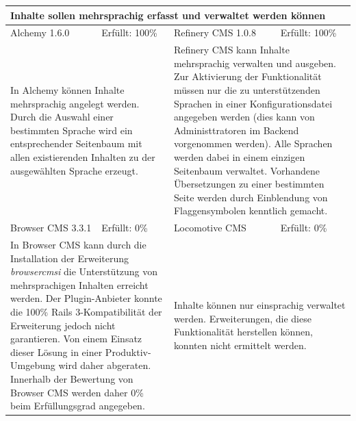 \newline
\newline
\newline
\begin{tabular}[!ht]{|l|l|l|l|}
\hline
\multicolumn{4}{|p{15cm}|}{\textbf{Inhalte sollen mehrsprachig erfasst und verwaltet werden können}} \\
\hline
  Alchemy 1.6.0 & \cellcolor{green}Erfüllt: 100\% & Refinery CMS 1.0.8 & \cellcolor{green}Erfüllt: 100\% \\
  \hline
  \multicolumn{2}{|p{7.5cm}|}{In Alchemy können Inhalte mehrsprachig angelegt werden. Durch die Auswahl einer bestimmten Sprache wird ein entsprechender Seitenbaum mit allen existierenden Inhalten zu der ausgewählten Sprache erzeugt.}
   & \multicolumn{2}{p{7.5cm}|}{Refinery CMS kann Inhalte mehrsprachig verwalten und ausgeben. Zur Aktivierung der Funktionalität müssen nur die zu unterstützenden Sprachen in einer Konfigurationsdatei angegeben werden (dies kann von Administtratoren im Backend vorgenommen werden). Alle Sprachen werden dabei in einem einzigen Seitenbaum verwaltet. Vorhandene Übersetzungen zu einer bestimmten Seite werden durch Einblendung von Flaggensymbolen kenntlich gemacht.} \\
  \hline
  Browser CMS 3.3.1 & \cellcolor{red}Erfüllt: 0\% & Locomotive CMS & \cellcolor{red}Erfüllt: 0\% \\
  \hline
  \multicolumn{2}{|p{7.5cm}|}{In Browser CMS kann  durch die Installation der Erweiterung \emph{browsercmsi} die Unterstützung von mehrsprachigen Inhalten erreicht werden. Der Plugin-Anbieter konnte die 100\% Rails 3-Kompatibilität der Erweiterung jedoch nicht garantieren. Von einem Einsatz dieser Lösung in einer Produktiv-Umgebung wird daher abgeraten. Innerhalb der Bewertung von Browser CMS werden daher 0\% beim Erfüllungsgrad angegeben.} & \multicolumn{2}{p{7.5cm}|}{Inhalte können nur einsprachig verwaltet werden. Erweiterungen, die diese Funktionalität herstellen können, konnten nicht ermittelt werden.} \\
\hline
\end{tabular}
\newline
\newline
\newline
